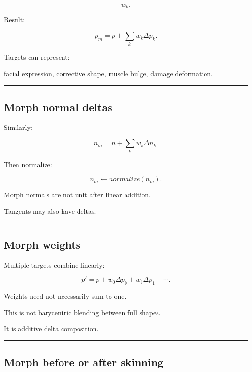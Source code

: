 \[
w_k.
\]

Result:

\[
\boxed{
p_m
=
p+
\sum_kw_k\Delta p_k.
}
\]

Targets can represent:

facial expression, corrective shape, muscle bulge, damage deformation.

\begin{center}\rule{0.5\linewidth}{0.5pt}\end{center}

\subsection{Morph normal deltas}\label{04-visual-computing-ii-ch041-morph-normal-deltas}

\hypertarget{04-visual-computing-ii-ch041-morph-normal-deltas}{}

Similarly:

\[
n_m=
n+
\sum_kw_k\Delta n_k.
\]

Then normalize:

\[
\boxed{
n_m\leftarrow
normalize(n_m).
}
\]

Morph normals are not unit after linear addition.

Tangents may also have deltas.

\begin{center}\rule{0.5\linewidth}{0.5pt}\end{center}

\subsection{Morph weights}\label{04-visual-computing-ii-ch041-morph-weights}

\hypertarget{04-visual-computing-ii-ch041-morph-weights}{}

Multiple targets combine linearly:

\[
p'
=
p+
w_0\Delta p_0
+
w_1\Delta p_1
+\cdots.
\]

Weights need not necessarily sum to one.

This is not barycentric blending between full shapes.

It is additive delta composition.

\begin{center}\rule{0.5\linewidth}{0.5pt}\end{center}

\subsection{Morph before or after skinning}\label{04-visual-computing-ii-ch041-morph-before-or-after-skinning}

